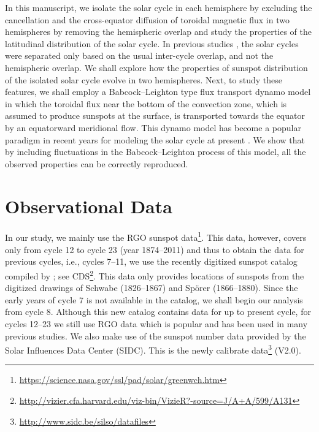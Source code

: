 \documentclass[preprint2,times,tighten]{aastex61}
\begin{document}
In this manuscript, we isolate the solar cycle in each hemisphere by excluding the cancellation and
the cross-equator diffusion of toroidal magnetic flux in two hemispheres by removing the hemispheric overlap
and study the properties of the latitudinal distribution of the solar cycle.
In previous studies \citep{2000JApA...21..163S, 2008A&A...483..623S, 2003SoPh..215...99L}, the solar cycles were separated only based on the usual inter-cycle
overlap, and not the hemispheric overlap. We shall explore how the properties of sunspot distribution
of the isolated solar cycle evolve in two hemispheres.
Next, to study these features, we shall employ a Babcock--Leighton type flux transport dynamo
model in which the toroidal flux near the bottom of the convection zone, which is
assumed to produce sunspots at the surface, is transported towards the equator
by an equatorward meridional flow. This dynamo model
has become a popular paradigm in recent years for modeling the solar cycle at present \citep{Kar14a,Ch15}.
We show that by including fluctuations in the Babcock--Leighton process of this model, all the observed properties can be correctly reproduced.

\section{ Observational Data }\label{sec:data}

In our study, we mainly use the RGO sunspot data\footnote{\url{https://science.nasa.gov/ssl/pad/solar/greenwch.htm}}.
This data, however, covers only from cycle 12 to cycle 23 (year 1874--2011) and thus
to obtain the data for previous cycles, i.e., cycles 7--11, we use the recently digitized sunspot catalog 
compiled by \citet{2017A&A...599A.131L}; see CDS\footnote{\url{http://vizier.cfa.harvard.edu/viz-bin/VizieR?-source=J/A+A/599/A131}}. 
This data only provides locations of sunspots from the digitized drawings of Schwabe (1826--1867) and Sp{\"o}rer (1866--1880).
Since the early years of cycle 7 is not available in the \citet{2017A&A...599A.131L} catalog,
we shall begin our analysis from cycle 8.
Although this new catalog contains data for up to present cycle, for cycles 12--23 we still use RGO data which is popular and has been used in many previous studies.
We also make use of the sunspot number data provided by the Solar Influences Data Center (SIDC). 
This is the newly calibrate data\footnote{\url{http://www.sidc.be/silso/datafiles}} (V2.0). 
\end{document}

